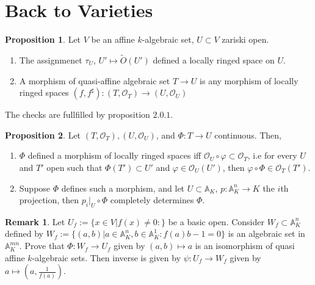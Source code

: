 \documentclass{article}
\theoremstyle{definition}
\theoremstyle{definition}
\theoremstyle{definition}
\newtheorem{remark}{Remark}[theorem]
\theoremstyle{definition}
\newtheorem{proposition}{Proposition}[theorem]
\theoremstyle{definition}
\theoremstyle{definition}
\theoremstyle{definition}
\begin{document}
\section{Back to Varieties}


\begin{tcolorbox}[colback=blue!5!white,colframe=blue!30!white]
\begin{proposition}
    Let $V$ be an affine $k$-algebraic set, $U\subset V$ zariski open. 
    \begin{enumerate}
        \item The assignmenet $\tau_U$, $U'\mapsto \tilde{O}(U')$ defined a locally ringed space on $U$.
        \item A morphism of quasi-affine algebraic set $T\to U$ is any morphism of locally ringed spaces $(f,f^{\sharp}):(T,\mathcal{O}_T)\to (U,\mathcal{O}_U)$
    \end{enumerate}
\end{proposition}
\end{tcolorbox}
The checks are fullfilled by proposition $2.0.1$. 


\begin{tcolorbox}[colback=blue!5!white,colframe=blue!30!white]
\begin{proposition}
Let $(T, \mathcal{O}_T), (U,\mathcal{O}_U)$, and $\Phi: T\to U$ continuous. Then,
\begin{enumerate}
    \item $\Phi$ defined a morphism of locally ringed spaces iff $\mathcal{O}_U\circ \varphi\subset \mathcal{O}_T$, i.e for every $U$ and $T'$ open such that $\Phi(T')\subset U'$ and $\varphi\in \mathcal{O}_U(U')$, then $\varphi\circ \Phi\in \mathcal{O}_T(T')$. 
    \item Suppose $\Phi$ defines such a morphism, and let $U\subset \mathbb{A}_K$, $p: \mathbb{A}^n_K\to K$ the $i$th projection, then $p_i|_{U}\circ \Phi$ completely determines $\Phi$. 
\end{enumerate}
\end{proposition}
\end{tcolorbox}


\begin{tcolorbox}[colback=green!5!white,colframe=green!30!white]
\begin{remark}
Let $U_f:=\{ x\in V|f(x)\neq 0: \}$ be a basic open. Consider $W_f\subset \mathbb{A}^n_K$ defined by $W_f:=\{ (a,b)| a\in \mathbb{A}^n_K, b\in \mathbb{A}^1_K:f(a)b-1=0 \}$ is an algebraic set in $\mathbb{A}^{mn}_K$. Prove that $\Phi: W_f\to U_f$ given by $(a,b)\mapsto a$ is an isomorphism of quasi affine $k$-algebraic sets. Then inverse is given by $\psi: U_f\to W_f$ given by $a\mapsto (a,\frac{1}{f(a)})$.
\end{remark}
\end{tcolorbox}
\end{document}
